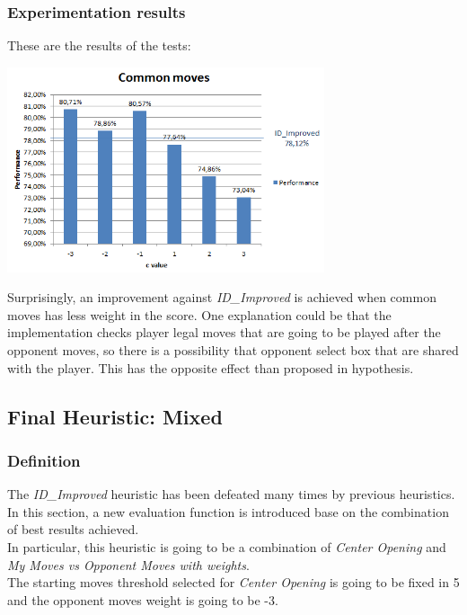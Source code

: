 \documentclass[10pt, a4paper,english]{article}
\begin{document}
\subsubsection{Experimentation results}

These are the results of the tests:

\begin{center}
\includegraphics[width=0.7\textwidth]{commonmoves.png}\\
\end{center}

Surprisingly, an improvement against \textit{ID\_Improved} is achieved when common moves has less weight in the score. One explanation could be that the implementation checks player legal moves that are going to be played after the opponent moves, so there is a possibility that opponent select box that are shared with the player. This has the opposite effect than proposed in hypothesis.

\subsection{Final Heuristic: Mixed}

\subsubsection{Definition}

The \textit{ID\_Improved} heuristic has been defeated many times by previous heuristics. In this section, a new evaluation function is introduced base on the combination of best results achieved. \\

In particular, this heuristic is going to be a combination of \textit{Center Opening} and \textit{My Moves vs Opponent Moves with weights}. \\

The starting moves threshold selected for \textit{Center Opening} is going to be fixed in 5 and the opponent moves weight is going to be -3. \\
\end{document}
